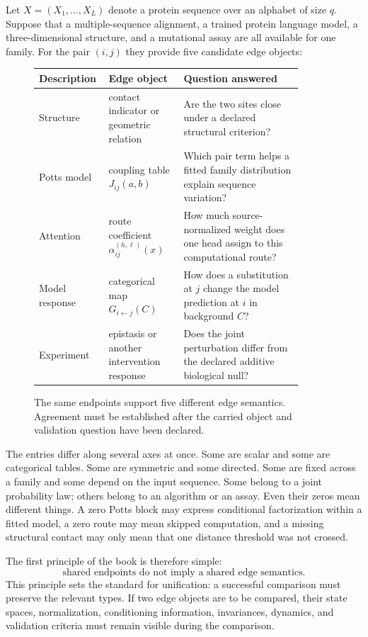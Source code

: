 Let $X=(X_1,\ldots,X_L)$ denote a protein sequence over an alphabet of size $q$.  Suppose that a
multiple-sequence alignment, a trained protein language model, a three-dimensional structure, and
a mutational assay are all available for one family.  For the pair $(i,j)$ they provide five
candidate edge objects:
\begin{figure}[htbp]
\centering
\small
\begin{tabular}{>{\raggedright\arraybackslash}p{0.18\linewidth}
                >{\raggedright\arraybackslash}p{0.27\linewidth}
                >{\raggedright\arraybackslash}p{0.43\linewidth}}
\toprule
Description & Edge object & Question answered \\
\midrule
Structure & contact indicator or geometric relation & Are the two sites close under a declared
structural criterion? \\
Potts model & coupling table $J_{ij}(a,b)$ & Which pair term helps a fitted family distribution
explain sequence variation? \\
Attention & route coefficient $\alpha_{ij}^{(h,\ell)}(x)$ & How much source-normalized weight does
one head assign to this computational route? \\
Model response & categorical map $G_{i\leftarrow j}(C)$ & How does a substitution at $j$ change
the model prediction at $i$ in background $C$? \\
Experiment & epistasis or another intervention response & Does the joint perturbation differ from
the declared additive biological null? \\
\bottomrule
\end{tabular}
\caption{The same endpoints support five different edge semantics.  Agreement must be established
after the carried object and validation question have been declared.}
\label{fig:five-edge-semantics}
\end{figure}

The entries differ along several axes at once.  Some are scalar and some are categorical tables.
Some are symmetric and some directed.  Some are fixed across a family and some depend on the input
sequence.  Some belong to a joint probability law; others belong to an algorithm or an assay.
Even their zeros mean different things.  A zero Potts block may express conditional factorization
within a fitted model, a zero route may mean skipped computation, and a missing structural contact
may only mean that one distance threshold was not crossed.

The first principle of the book is therefore simple:
\begin{equation}
\boxed{\text{shared endpoints do not imply a shared edge semantics.}}
\label{eq:book-shared-endpoints}
\end{equation}
This principle sets the standard for unification: a successful comparison must preserve the
relevant types.  If two edge objects are to be compared, their state spaces, normalization,
conditioning information, invariances, dynamics, and validation criteria must remain visible
during the comparison.

